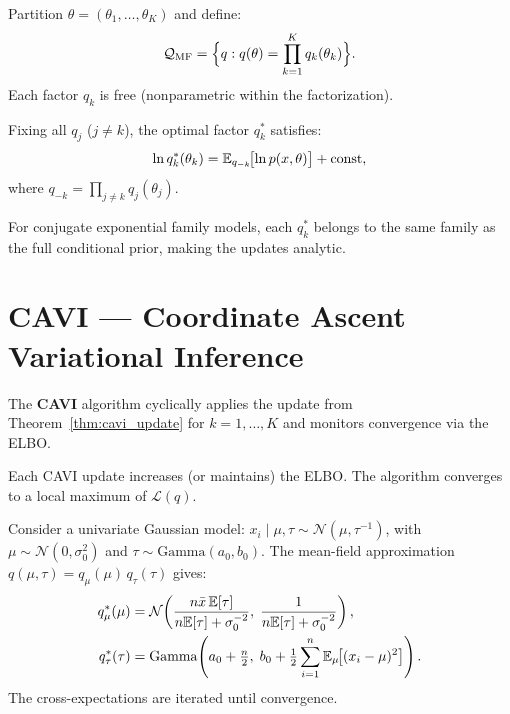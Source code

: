 \begin{definition}
Partition $\theta = (\theta_1, \ldots, \theta_K)$ and define:
\[
  \mathcal{Q}_{\mathrm{MF}} = \Bigl\{ q : q(\theta) = \prod_{k=1}^K q_k(\theta_k) \Bigr\}.
\]
Each factor $q_k$ is free (nonparametric within the factorization).
\end{definition}

\begin{theorem}
\label{thm:cavi_update}
Fixing all $q_j$ ($j \neq k$), the optimal factor $q_k^*$ satisfies:
\[
  \ln q_k^*(\theta_k) = \mathbb{E}_{q_{-k}}\!\bigl[\ln p(x, \theta)\bigr] + \mathrm{const},
\]
where $q_{-k} = \prod_{j \neq k} q_j(\theta_j)$.
\end{theorem}

\begin{remark}
For conjugate exponential family models, each $q_k^*$ belongs to the same
family as the full conditional prior, making the updates analytic.
\end{remark}

\section{CAVI --- Coordinate Ascent Variational Inference}

\begin{definition}
The \textbf{CAVI} algorithm cyclically applies the update from
Theorem~\ref{thm:cavi_update} for $k = 1, \ldots, K$ and monitors
convergence via the ELBO.
\end{definition}

\begin{proposition}
Each CAVI update increases (or maintains) the ELBO. The algorithm
converges to a local maximum of $\mathcal{L}(q)$.
\end{proposition}

\begin{example}
Consider a univariate Gaussian model: $x_i \mid \mu, \tau \sim \mathcal{N}(\mu, \tau^{-1})$,
with $\mu \sim \mathcal{N}(0, \sigma_0^2)$ and $\tau \sim \mathrm{Gamma}(a_0, b_0)$.
The mean-field approximation $q(\mu, \tau) = q_\mu(\mu)\,q_\tau(\tau)$ gives:
\begin{align}
  q_\mu^*(\mu) &= \mathcal{N}\!\left(\frac{n\bar{x}\,\mathbb{E}[\tau]}{n\mathbb{E}[\tau] + \sigma_0^{-2}},\;
                   \frac{1}{n\mathbb{E}[\tau] + \sigma_0^{-2}}\right), \\
  q_\tau^*(\tau) &= \mathrm{Gamma}\!\left(a_0 + \tfrac{n}{2},\;
                   b_0 + \tfrac{1}{2}\sum_{i=1}^n \mathbb{E}_\mu\!\bigl[(x_i - \mu)^2\bigr]\right).
\end{align}
The cross-expectations are iterated until convergence.
\end{example}

